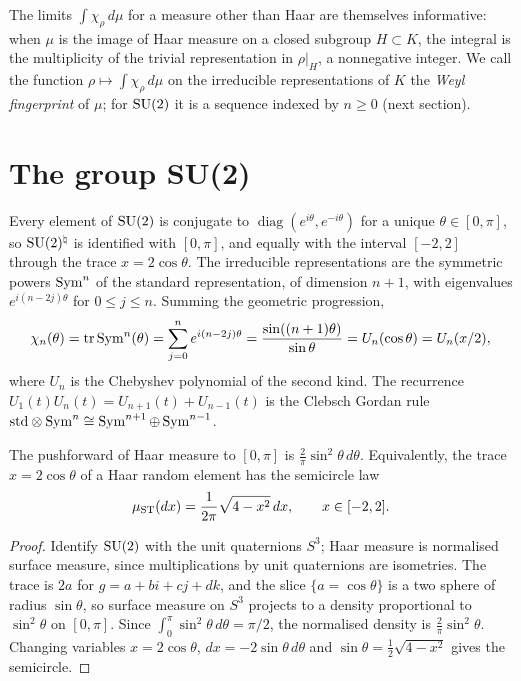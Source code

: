 The limits $\int \chi_\rho\,d\mu$ for a measure other than Haar are themselves informative: when $\mu$ is the image of Haar measure on a closed subgroup $H \subset K$, the integral is the multiplicity of the trivial representation in $\rho|_H$, a nonnegative integer. We call the function $\rho \mapsto \int \chi_\rho\,d\mu$ on the irreducible representations of $K$ the \emph{Weyl fingerprint} of $\mu$; for $\mathrm{SU}(2)$ it is a sequence indexed by $n \ge 0$ (next section).

\section{The group SU(2)}

Every element of $\mathrm{SU}(2)$ is conjugate to $\operatorname{diag}(e^{i\theta}, e^{-i\theta})$ for a unique $\theta \in [0,\pi]$, so $\mathrm{SU}(2)^\natural$ is identified with $[0,\pi]$, and equally with the interval $[-2,2]$ through the trace $x = 2\cos\theta$. The irreducible representations are the symmetric powers $\operatorname{Sym}^n$ of the standard representation, of dimension $n+1$, with eigenvalues $e^{i(n-2j)\theta}$ for $0\le j\le n$. Summing the geometric progression,
\[
\chi_n(\theta) = \operatorname{tr}\operatorname{Sym}^n(\theta) = \sum_{j=0}^n e^{i(n-2j)\theta} = \frac{\sin((n+1)\theta)}{\sin\theta} = U_n(\cos\theta) = U_n(x/2),
\]
where $U_n$ is the Chebyshev polynomial of the second kind. The recurrence $U_1(t)U_n(t) = U_{n+1}(t) + U_{n-1}(t)$ is the Clebsch Gordan rule $\mathrm{std}\otimes\operatorname{Sym}^n \cong \operatorname{Sym}^{n+1}\oplus\operatorname{Sym}^{n-1}$.

\begin{proposition}
The pushforward of Haar measure to $[0,\pi]$ is $\frac{2}{\pi}\sin^2\theta\,d\theta$. Equivalently, the trace $x = 2\cos\theta$ of a Haar random element has the semicircle law
\[
\mu_{\mathrm{ST}}(dx) = \frac{1}{2\pi}\sqrt{4 - x^2}\,dx, \qquad x \in [-2,2].
\]
\end{proposition}

\begin{proof}
Identify $\mathrm{SU}(2)$ with the unit quaternions $S^3$; Haar measure is normalised surface measure, since multiplications by unit quaternions are isometries. The trace is $2a$ for $g = a + bi + cj + dk$, and the slice $\{a = \cos\theta\}$ is a two sphere of radius $\sin\theta$, so surface measure on $S^3$ projects to a density proportional to $\sin^2\theta$ on $[0,\pi]$. Since $\int_0^\pi \sin^2\theta\,d\theta = \pi/2$, the normalised density is $\frac{2}{\pi}\sin^2\theta$. Changing variables $x = 2\cos\theta$, $dx = -2\sin\theta\,d\theta$ and $\sin\theta = \frac12\sqrt{4-x^2}$ gives the semicircle.
\end{proof}


